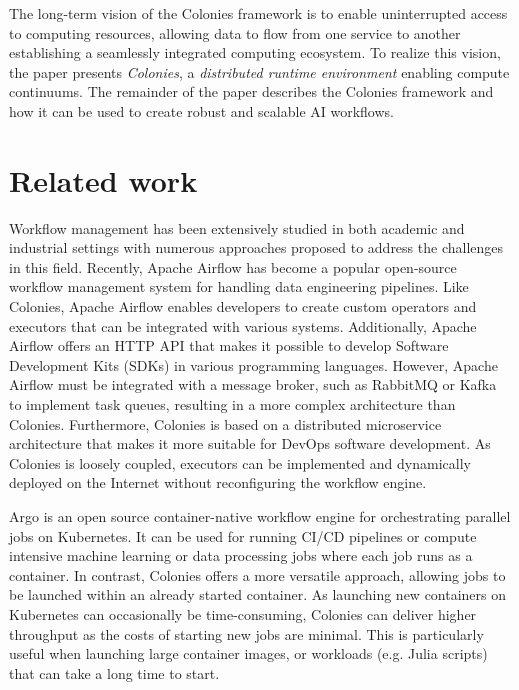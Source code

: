 \documentclass{article}
\begin{document}
The long-term vision of the Colonies framework is to enable uninterrupted access to computing resources, allowing data to flow from one service to another establishing a seamlessly integrated computing ecosystem. To realize this vision, the paper presents \emph{Colonies}, a \emph{distributed runtime environment} enabling compute continuums. The remainder of the paper describes the Colonies framework and how it can be used to create robust and scalable AI workflows.

\section{Related work}
Workflow management has been extensively studied in both academic and industrial settings with numerous approaches \cite{scafe, synapse, service_wfs, schmitt2022workflow, GarciaRepresa1740746, Ouyang2010, NIKOLOV2021100440, workflow_in_bigdata} proposed to address the challenges in this field. Recently, Apache Airflow \cite{apache_airflow} has become a popular open-source workflow management system for handling data engineering pipelines. Like Colonies, Apache Airflow enables developers to create custom operators and executors that can be integrated with various systems. Additionally, Apache Airflow offers an HTTP API that makes it possible to develop Software Development Kits (SDKs) in various programming languages. However, Apache Airflow must be integrated with a message broker, such as RabbitMQ \cite{rabbitmq} or Kafka \cite{apache_kafka} to implement task queues, resulting in a more complex architecture than Colonies. Furthermore, Colonies is based on a distributed microservice architecture that makes it more suitable for DevOps software development. As Colonies is loosely coupled, executors can be implemented and dynamically deployed on the Internet without reconfiguring the workflow engine.


Argo \cite{argowf} is an open source container-native workflow engine for orchestrating parallel jobs on Kubernetes. It can be used for running CI/CD pipelines or compute intensive machine learning or data processing jobs where each job runs as a container. In contrast, Colonies offers a more versatile approach, allowing jobs to be launched within an already started container. As launching new containers on Kubernetes can occasionally be time-consuming, Colonies can deliver higher throughput as the costs of starting new jobs are minimal. This is particularly useful when launching large container images, or workloads (e.g. Julia scripts) that can take a long time to start. 
\end{document}

